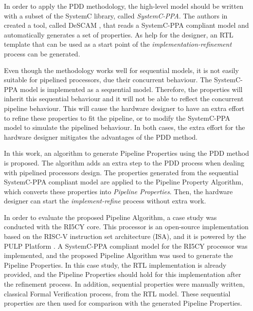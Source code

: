 In order to apply the PDD methodology, the high-level model should be written with a subset of the SystemC \cite{lib-systemc} library, called \textit{SystemC-PPA}. The authors in \cite{paper-pdd} created a tool, called DeSCAM \cite{descam}, that reads a SystemC-PPA compliant model and automatically generates a set of properties. As help for the designer, an RTL template that can be used as a start point of the \textit{implementation-refinement} process can be generated.

Even though the methodology works well for sequential models, it is not easily suitable for pipelined processors, due their concurrent behaviour. The SystemC-PPA model is implemented as a sequential model. Therefore, the properties will inherit this sequential behaviour and it will not be able to reflect the concurrent pipeline behaviour. This will cause the hardware designer to have an extra effort to refine these properties to fit the pipeline, or to modify the SystemC-PPA model to simulate the pipelined behaviour. In both cases, the extra effort for the hardware designer mitigates the advantages of the PDD method.

In this work, an algorithm to generate Pipeline Properties using the PDD method is proposed. The algorithm adds an extra step to the PDD process when dealing with pipelined processors design. The properties generated from the sequential SystemC-PPA compliant model are applied to the Pipeline Property Algorithm, which converts these properties into \textit{Pipeline Properties}. Then, the hardware designer can start the \textit{implement-refine} process without extra work.

In order to evaluate the proposed Pipeline Algorithm, a case study was conducted with the RI5CY   core. This processor is an open-source implementation based on the RISC-V instruction set architecture (ISA), and it is powered by the PULP Platform \cite{pulp}. A SystemC-PPA compliant model for the RI5CY processor was implemented, and the proposed Pipeline Algorithm was used to generate the Pipeline Properties. In this case study, the RTL implementation is already provided, and the Pipeline Properties should hold for this implementation after the refinement process. In addition, sequential properties were manually written, classical Formal Verification process, from the RTL model. These sequential properties are then used for comparison with the generated Pipeline Properties.

